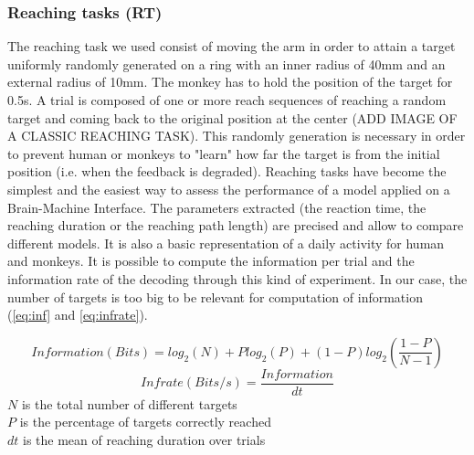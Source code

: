 \documentclass[preprint,12pt]{elsarticle}
\begin{document}
\subsubsection{Reaching tasks (RT)}
The reaching task we used consist of moving the arm in order to attain a target uniformly randomly generated on a ring with an inner radius of 40mm and an external radius of 10mm. The monkey has to hold the position of the target for 0.5s. A trial is composed of one or more reach sequences of reaching a random target and coming back to the original position at the center (ADD IMAGE OF A CLASSIC REACHING TASK). This randomly generation is necessary in order to prevent human or monkeys to "learn" how far the target is from the initial position (i.e. when the feedback is degraded).
Reaching tasks have become the simplest and the easiest way to assess the performance of a model applied on a Brain-Machine Interface. The parameters extracted (the reaction time, the reaching duration or the reaching path length) are precised and allow to compare different models. It is also a basic representation of a daily activity for human and monkeys. It is possible to compute the information per trial and the information rate of the decoding through this kind of experiment. In our case, the number of targets is too big to be relevant for computation of information (\ref{eq:inf} and \ref{eq:infrate}). 

\begin{equation} 
Information (Bits) = log_2(N) + Plog_2(P) + (1 - P)log_2(\frac{1-P}{N-1})
\label{eq:inf}
\end{equation}
\begin{equation} 
Infrate (Bits/s) = \frac{Information}{dt}
\label{eq:infrate}
\end{equation}
$N$ is the total number of different targets \\
$P$ is the percentage of targets correctly reached\\
$dt$ is the mean of reaching duration over trials
\end{document}
